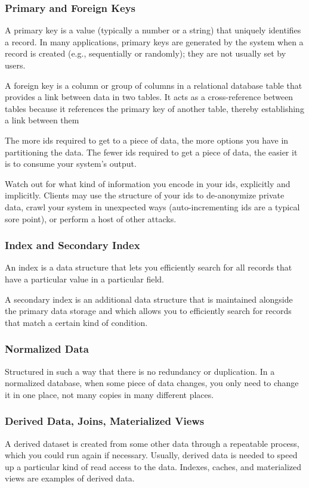 \documentclass{article}
\begin{document}
    \subsubsection{Primary and Foreign Keys}
    A primary key is a value (typically a number or a string) that uniquely identifies a record. In many applications, primary keys are generated by the system when a record is created (e.g., sequentially or randomly); they are not usually set by users.
    
    A foreign key is a column or group of columns in a relational database table that provides a link between data in two tables. It acts as a cross-reference between tables because it references the primary key of another table, thereby establishing a link between them
    
    The more ids required to get to a piece of data, the more options you have in partitioning the data. The fewer ids required to get a piece of data, the easier it is to consume your system’s output.
    
    Watch out for what kind of information you encode in your ids, explicitly and implicitly. Clients may use the structure of your ids to de-anonymize private data, crawl your system in unexpected ways (auto-incrementing ids are a typical sore point), or perform a host of other attacks.
    
    \subsubsection{Index and Secondary Index}
    An index is a data structure that lets you efficiently   search for all records that have a particular value in a particular field.
    
    A secondary index is an additional data structure that is maintained alongside the primary data storage and which allows you to efficiently search for records that match a certain kind of condition.
    
    \subsubsection{Normalized Data}
    Structured in such a way that there is no redundancy or duplication. In a normalized database, when some piece of data changes, you only need to change it in one place, not many copies in many different places.
    
    \subsubsection{Derived Data, Joins, Materialized Views}
    A derived dataset is created from some other data through a repeatable process, which you could run again if necessary. Usually, derived data is needed to speed up a particular kind of read access to the data.  Indexes, caches, and materialized views are examples of derived data.
    
\end{document}
